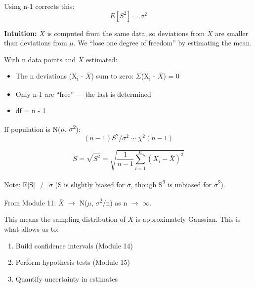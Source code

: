 Using n-1 corrects this:\PSbr{}\[E[S^2] = \sigma^2\]

\textbf{Intuition:} \ensuremath{\bar{X}} is computed from the same data, so deviations from \ensuremath{\bar{X}} are smaller than deviations from \ensuremath{\mu}. We ``lose one degree of freedom'' by estimating the mean.


With n data points and \ensuremath{\bar{X}} estimated:

\begin{itemize}
\tightlist
\item
  The n deviations (X\textsubscript{i} - \ensuremath{\bar{X}}) sum to zero: \ensuremath{\Sigma}(X\textsubscript{i} - \ensuremath{\bar{X}}) = 0
\item
  Only n-1 are ``free'' — the last is determined
\item
  df = n - 1
\end{itemize}


If population is N(\ensuremath{\mu}, \ensuremath{\sigma}\textsuperscript{2}):\PSbr{}\[(n-1)S^2/\sigma^2 \sim \chi^2(n-1)\]


\[S = \sqrt{S^2} = \sqrt{\frac{1}{n-1}\sum_{i=1}^n (X_i - \bar{X})^2}\]

Note: E[S] \ensuremath{\neq} \ensuremath{\sigma} (S is slightly biased for \ensuremath{\sigma}, though S\textsuperscript{2} is unbiased for \ensuremath{\sigma}\textsuperscript{2}).


From Module 11: \ensuremath{\bar{X}} \ensuremath{\to} N(\ensuremath{\mu}, \ensuremath{\sigma}\textsuperscript{2}/n) as n \ensuremath{\to} \ensuremath{\infty}.

This means the sampling distribution of \ensuremath{\bar{X}} is approximately Gaussian. This is what allows us to:

\begin{enumerate}
\def\labelenumi{\arabic{enumi}.}
\tightlist
\item
  Build confidence intervals (Module 14)
\item
  Perform hypothesis tests (Module 15)
\item
  Quantify uncertainty in estimates
\end{enumerate}

